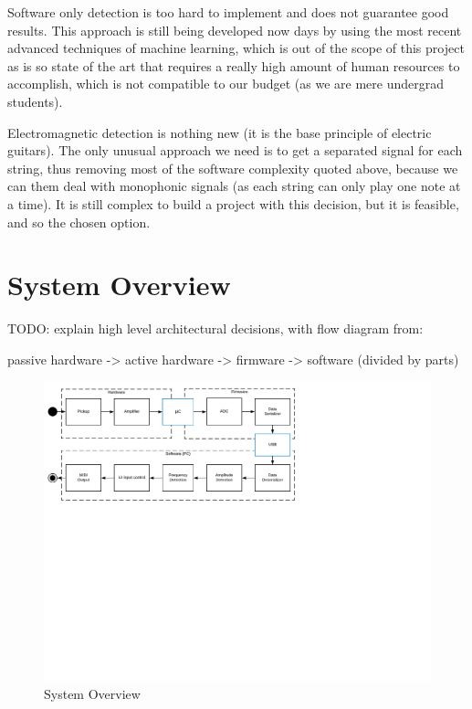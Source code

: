 Software only detection is too hard to implement and does not guarantee good results.
This approach is still being developed now days by using the most recent advanced
techniques of machine learning, which is out of the scope of this project as is so
state of the art that requires a really high amount of human resources to accomplish,
which is not compatible to our budget (as we are mere undergrad students). 

Electromagnetic detection is nothing new (it is the base principle of electric guitars).
The only unusual approach we need is to get a separated signal for each string, thus
removing most of the software complexity quoted above, because we can them deal
with monophonic signals (as each string can only play one note at a time). It is
still complex to build a project with this decision, but it is feasible, and so
the chosen option.

\section{System Overview}
TODO: explain high level architectural decisions, with flow diagram from: 

passive hardware  -> active hardware -> firmware -> software (divided by parts)

\begin{figure}[!htpb]
  \centering
  \caption{System Overview}
  \label{system-overview}
  \includegraphics[scale=0.85]{images/system-overview}
\end{figure}